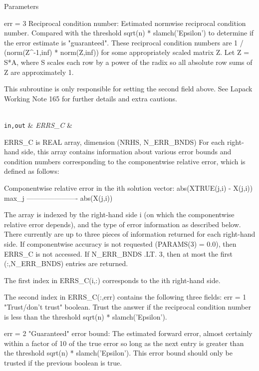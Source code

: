 \begin{DoxyParams}[1]{Parameters}
\begin{DoxyVerb}
     err = 3  Reciprocal condition number: Estimated normwise
              reciprocal condition number.  Compared with the threshold
              sqrt(n) * slamch('Epsilon') to determine if the error
              estimate is "guaranteed". These reciprocal condition
              numbers are 1 / (norm(Z^{-1},inf) * norm(Z,inf)) for some
              appropriately scaled matrix Z.
              Let Z = S*A, where S scales each row by a power of the
              radix so all absolute row sums of Z are approximately 1.

     This subroutine is only responsible for setting the second field
     above.
     See Lapack Working Note 165 for further details and extra
     cautions.\end{DoxyVerb}
\\
\hline
\mbox{\tt in,out}  & {\em E\+R\+R\+S\+\_\+\+C} & \begin{DoxyVerb}          ERRS_C is REAL array, dimension (NRHS, N_ERR_BNDS)
     For each right-hand side, this array contains information about
     various error bounds and condition numbers corresponding to the
     componentwise relative error, which is defined as follows:

     Componentwise relative error in the ith solution vector:
                    abs(XTRUE(j,i) - X(j,i))
             max_j ----------------------
                         abs(X(j,i))

     The array is indexed by the right-hand side i (on which the
     componentwise relative error depends), and the type of error
     information as described below. There currently are up to three
     pieces of information returned for each right-hand side. If
     componentwise accuracy is not requested (PARAMS(3) = 0.0), then
     ERRS_C is not accessed.  If N_ERR_BNDS .LT. 3, then at most
     the first (:,N_ERR_BNDS) entries are returned.

     The first index in ERRS_C(i,:) corresponds to the ith
     right-hand side.

     The second index in ERRS_C(:,err) contains the following
     three fields:
     err = 1 "Trust/don't trust" boolean. Trust the answer if the
              reciprocal condition number is less than the threshold
              sqrt(n) * slamch('Epsilon').

     err = 2 "Guaranteed" error bound: The estimated forward error,
              almost certainly within a factor of 10 of the true error
              so long as the next entry is greater than the threshold
              sqrt(n) * slamch('Epsilon'). This error bound should only
              be trusted if the previous boolean is true.


\end{DoxyVerb}
\end{DoxyParams}
